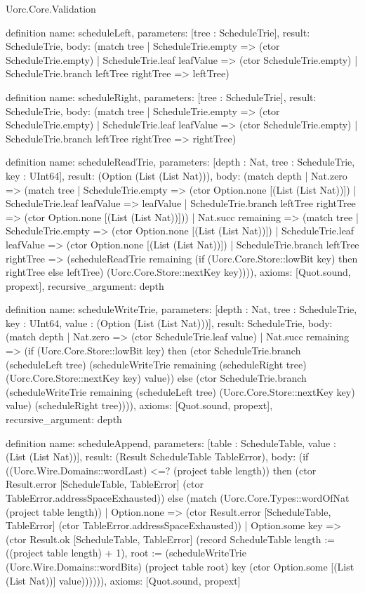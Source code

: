 \begin{lexlean}{Uorc.Core.Validation}
\begin{semanticmodule}
definition{
  name: scheduleLeft,
  parameters: [tree : ScheduleTrie],
  result: ScheduleTrie,
  body: (match tree
    | ScheduleTrie.empty => (ctor ScheduleTrie.empty)
    | ScheduleTrie.leaf leafValue => (ctor ScheduleTrie.empty)
    | ScheduleTrie.branch leftTree rightTree => leftTree)
}

definition{
  name: scheduleRight,
  parameters: [tree : ScheduleTrie],
  result: ScheduleTrie,
  body: (match tree
    | ScheduleTrie.empty => (ctor ScheduleTrie.empty)
    | ScheduleTrie.leaf leafValue => (ctor ScheduleTrie.empty)
    | ScheduleTrie.branch leftTree rightTree => rightTree)
}

definition{
  name: scheduleReadTrie,
  parameters: [depth : Nat, tree : ScheduleTrie, key : UInt64],
  result: (Option (List (List Nat))),
  body: (match depth
    | Nat.zero => (match tree
      | ScheduleTrie.empty => (ctor Option.none [(List (List Nat))])
      | ScheduleTrie.leaf leafValue => leafValue
      | ScheduleTrie.branch leftTree rightTree => (ctor Option.none [(List (List Nat))]))
    | Nat.succ remaining => (match tree
      | ScheduleTrie.empty => (ctor Option.none [(List (List Nat))])
      | ScheduleTrie.leaf leafValue => (ctor Option.none [(List (List Nat))])
      | ScheduleTrie.branch leftTree rightTree => (scheduleReadTrie remaining (if (Uorc.Core.Store::lowBit key) then rightTree else leftTree) (Uorc.Core.Store::nextKey key)))),
  axioms: [Quot.sound, propext],
  recursive_argument: depth
}

definition{
  name: scheduleWriteTrie,
  parameters: [depth : Nat, tree : ScheduleTrie, key : UInt64, value : (Option (List (List Nat)))],
  result: ScheduleTrie,
  body: (match depth
    | Nat.zero => (ctor ScheduleTrie.leaf value)
    | Nat.succ remaining => (if (Uorc.Core.Store::lowBit key) then (ctor ScheduleTrie.branch (scheduleLeft tree) (scheduleWriteTrie remaining (scheduleRight tree) (Uorc.Core.Store::nextKey key) value)) else (ctor ScheduleTrie.branch (scheduleWriteTrie remaining (scheduleLeft tree) (Uorc.Core.Store::nextKey key) value) (scheduleRight tree)))),
  axioms: [Quot.sound, propext],
  recursive_argument: depth
}

definition{
  name: scheduleAppend,
  parameters: [table : ScheduleTable, value : (List (List Nat))],
  result: (Result ScheduleTable TableError),
  body: (if ((Uorc.Wire.Domains::wordLast) <=? (project table length)) then (ctor Result.error [ScheduleTable, TableError] (ctor TableError.addressSpaceExhausted)) else (match (Uorc.Core.Types::wordOfNat (project table length))
    | Option.none => (ctor Result.error [ScheduleTable, TableError] (ctor TableError.addressSpaceExhausted))
    | Option.some key => (ctor Result.ok [ScheduleTable, TableError] (record ScheduleTable {length := ((project table length) + 1), root := (scheduleWriteTrie (Uorc.Wire.Domains::wordBits) (project table root) key (ctor Option.some [(List (List Nat))] value))})))),
  axioms: [Quot.sound, propext]
}


\end{semanticmodule}
\end{lexlean}
